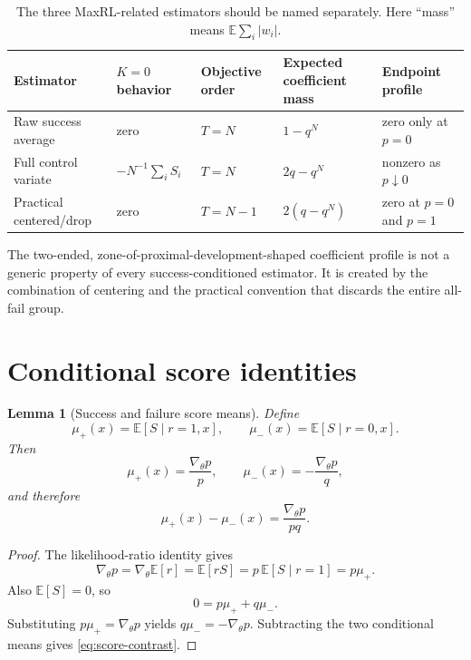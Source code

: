 \documentclass[11pt]{article}
\newcommand{\E}{\mathbb{E}}
\newcommand{\grad}{\nabla_{\!\theta}}
\newtheorem{lemma}[theorem]{Lemma}
\theoremstyle{definition}
\theoremstyle{remark}
\begin{document}
\begin{table}[H]
\centering
\footnotesize
\caption{The three MaxRL-related estimators should be named separately. Here ``mass'' means $\E\sum_i|w_i|$.}
\begin{tabularx}{\textwidth}{@{}p{}p{}p{}p{}X@{}}
\toprule
\textbf{Estimator} & \textbf{$K=0$ behavior} & \textbf{Objective order} & \textbf{Expected coefficient mass} & \textbf{Endpoint profile}\\
\midrule
Raw success average & zero & $T=N$ & $1-q^N$ & zero only at $p=0$\\
Full control variate & $-N^{-1}\sum_i S_i$ & $T=N$ & $2q-q^N$ & nonzero as $p\downarrow0$\\
Practical centered/drop & zero & $T=N-1$ & $2(q-q^N)$ & zero at $p=0$ and $p=1$\\
\bottomrule
\end{tabularx}
\end{table}

\begin{evidencebox}
The two-ended, zone-of-proximal-development-shaped coefficient profile is not a generic property of every success-conditioned estimator. It is created by the combination of centering and the practical convention that discards the entire all-fail group.
\end{evidencebox}

\section{Conditional score identities}

\begin{lemma}[Success and failure score means]
Define
\[
\mu_+(x)=\E[S\mid r=1,x],\qquad
\mu_-(x)=\E[S\mid r=0,x].
\]
Then
\begin{equation}
\mu_+(x)=\frac{\grad p}{p},\qquad
\mu_-(x)=-\frac{\grad p}{q},
\label{eq:conditional-score}
\end{equation}
and therefore
\begin{equation}
\mu_+(x)-\mu_-(x)=\frac{\grad p}{pq}.
\label{eq:score-contrast}
\end{equation}
\end{lemma}

\begin{proof}
The likelihood-ratio identity gives
\[
\grad p
=\grad\E[r]
=\E[rS]
=p\,\E[S\mid r=1]
=p\mu_+.
\]
Also $\E[S]=0$, so
\[
0=p\mu_+ + q\mu_-.
\]
Substituting $p\mu_+=\grad p$ yields $q\mu_-=-\grad p$. Subtracting the two conditional means gives \cref{eq:score-contrast}.
\end{proof}
\end{document}
